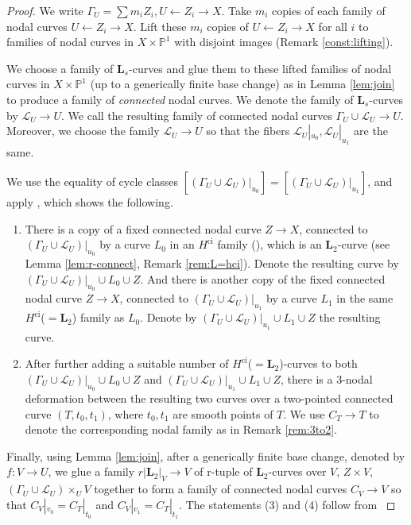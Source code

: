 \documentclass{amsart}
\theoremstyle{definition}
\theoremstyle{remark}
\newcommand{\mbb}{\mathbb}
\newcommand{\PP}{\mbb{P}}
\newcommand{\ci}{\text{ci}}
\begin{document}
\begin{proof}
    We write $\Gamma_U=\sum m_i Z_i, U \leftarrow Z_i \to X$.
Take $m_i$ copies of each family of nodal curves $U \leftarrow Z_i \to X$.
Lift these $m_i$ copies of $U \leftarrow Z_i \to X$ for all $i$ to families of nodal curves in $X \times \PP^1$ with disjoint images (Remark \ref{const:lifting}).

We choose a family of $\mathbf{L}_s$-curves and glue them to these lifted families of nodal curves in $X \times \PP^1$ (up to a generically finite base change) as in Lemma \ref{lem:join} to produce a family of \emph{connected} nodal curves. 
We denote the family of $\mathbf{L}_s$-curves by $\mathcal{L}_U \to U$.
We call the resulting family of connected nodal curves ${\Gamma}_U\cup \mathcal{L}_U \to U$.
Moreover, we choose the family $\mathcal{L}_U \to U$ so that the fibers $\mathcal{L}_U|_{u_0}, \mathcal{L}_U|_{u_1}$ are the same.



We use the equality of cycle classes $[({\Gamma}_U\cup \mathcal{L}_U)|_{u_0}]=[({\Gamma}_U\cup \mathcal{L}_U)|_{u_1}]$, and apply \cite[Corollary 35]{Kollar_Tian}, which shows the following.
\begin{enumerate}
\item There is a copy of a fixed connected nodal curve $Z \to X$, connected to $({\Gamma}_U\cup \mathcal{L}_U)|_{u_0}$ by a curve $L_0$ in an $H^\ci$ family (\cite[28]{Kollar_Tian}), which is an $\mathbf{L}_2$-curve (see Lemma \ref{lem:r-connect}, Remark \ref{rem:L=hci}). 
Denote the resulting curve by $({\Gamma}_U\cup \mathcal{L}_U)|_{u_0} \cup L_0 \cup Z$.
And there is another copy of the fixed connected nodal curve $Z \to X$, connected to $({\Gamma}_U\cup \mathcal{L}_U)|_{u_1}$ by a curve $L_1$ in the same $H^\ci$($=\mathbf{L}_2$) family as $L_0$. Denote by $({\Gamma}_U\cup \mathcal{L}_U)|_{u_1} \cup L_1 \cup Z$ the resulting curve.
        
        \item  After further adding a suitable number of $H^\ci$($=\mathbf{L}_2$)-curves to both $({\Gamma}_U\cup \mathcal{L}_U)|_{u_0} \cup L_0 \cup Z$ and $({\Gamma}_U\cup \mathcal{L}_U)|_{u_1} \cup L_1 \cup Z$, there is a $3$-nodal deformation between the resulting two curves over a two-pointed connected curve $({T}, t_0, t_1) $, where $t_0, t_1$ are smooth points of ${T}$.
        We use $C_T\to T$ to denote the corresponding nodal family as in Remark \ref{rem:3to2}. 
    \end{enumerate}
    Finally, using Lemma \ref{lem:join}, after a generically finite base change, denoted by $f: V \to U$, we glue a family $r|\mathbf{L}_2|_V \to V$ of r-tuple of $\mathbf{L}_2$-curves over $V$, $Z \times V$, $(\Gamma_U \cup \mathcal{L}_U)\times_U V$ together to form a family of connected nodal curves $C_V \to V$ so that $C_V|_{v_0}=C_T|_{t_0}$ and $C_V|_{v_1}=C_T|_{t_1}$.
    The statements (3) and (4) follow from \cite[Corollary 35.4, Complement 36]{Kollar_Tian}
\end{proof}
\end{document}
